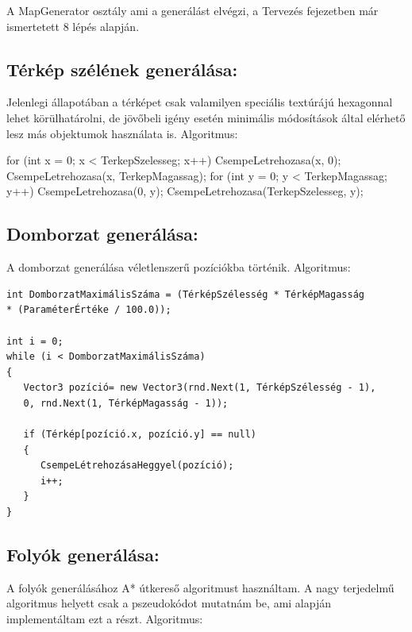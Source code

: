\noindent A MapGenerator osztály ami a generálást elvégzi, a Tervezés fejezetben már ismertetett 8 lépés alapján.

\subsection{Térkép szélének generálása:}

Jelenlegi állapotában a térképet csak valamilyen speciális textúrájú hexagonnal lehet körülhatárolni, de jövőbeli igény esetén minimális módosítások által elérhető lesz más objektumok használata is. 
\newline
\newline Algoritmus:

\begin{cpp}
for (int x = 0; x < TerkepSzelesseg; x++)
{
   CsempeLetrehozasa(x, 0);
   CsempeLetrehozasa(x, TerkepMagassag);
}
for (int y = 0; y < TerkepMagassag; y++)
{
   CsempeLetrehozasa(0, y);
   CsempeLetrehozasa(TerkepSzelesseg, y);
}
\end{cpp}

\subsection{Domborzat generálása:}

A domborzat generálása véletlenszerű pozíciókba történik.
\newline
\newline Algoritmus:

\begin{verbatim}
int DomborzatMaximálisSzáma = (TérképSzélesség * TérképMagasság
* (ParaméterÉrtéke / 100.0));

int i = 0;
while (i < DomborzatMaximálisSzáma)
{
   Vector3 pozíció= new Vector3(rnd.Next(1, TérképSzélesség - 1),
   0, rnd.Next(1, TérképMagasság - 1));

   if (Térkép[pozíció.x, pozíció.y] == null)
   {
      CsempeLétrehozásaHeggyel(pozíció);
      i++;
   }
}
\end{verbatim}

\subsection{Folyók generálása:}

A folyók generálásához A* útkereső algoritmust használtam. A nagy terjedelmű algoritmus helyett csak a pszeudokódot mutatnám be, ami alapján implementáltam ezt a részt.
\newline
\newline Algoritmus:

